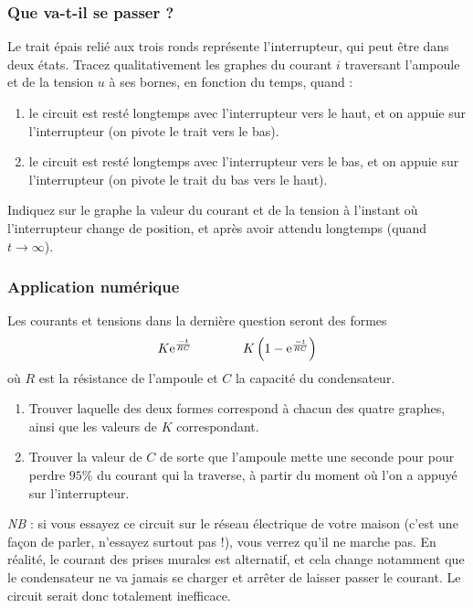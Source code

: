 \documentclass{article}
\begin{document}
\subsubsection{Que va-t-il se passer ?}

Le trait épais relié aux trois ronds représente l'interrupteur, qui peut être dans deux états. Tracez qualitativement les graphes du courant $i$ traversant l'ampoule et de la tension $u$ à ses bornes, en fonction du temps, quand :
\begin{enumerate}
    \item le circuit est resté longtemps avec l'interrupteur vers le haut, et on appuie sur l'interrupteur (on pivote le trait vers le bas).
    \item le circuit est resté longtemps avec l'interrupteur vers le bas, et on appuie sur l'interrupteur (on pivote le trait du bas vers le haut).
\end{enumerate}

Indiquez sur le graphe la valeur du courant et de la tension à l'instant où l'interrupteur change de position, et après avoir attendu longtemps (quand $t \to \infty$).

\subsubsection{Application numérique}

Les courants et tensions dans la dernière question seront des formes
\[
\arraycolsep=20pt
\begin{array}{cc}
    \displaystyle
    K \mathrm{e}^\frac{-t}{RC} & K\left(1-\mathrm{e}^\frac{-t}{RC}\right)
\end{array}\]
où $R$ est la résistance de l'ampoule et $C$ la capacité du condensateur.

\begin{enumerate}
    \item Trouver laquelle des deux formes correspond à chacun des quatre graphes, ainsi que les valeurs de $K$ correspondant.
    \item Trouver la valeur de $C$ de sorte que l'ampoule mette une seconde pour pour perdre $95\%$ du courant qui la traverse, à partir du moment où l'on a appuyé sur l'interrupteur.%
\end{enumerate}

\textit{NB} : si vous essayez ce circuit sur le réseau électrique de votre maison (c'est une façon de parler, n'essayez surtout pas !), vous verrez qu'il ne marche pas. En réalité, le courant des prises murales est alternatif, et cela change notamment que le condensateur ne va jamais se charger et arrêter de laisser passer le courant. Le circuit serait donc totalement inefficace.
\end{document}
